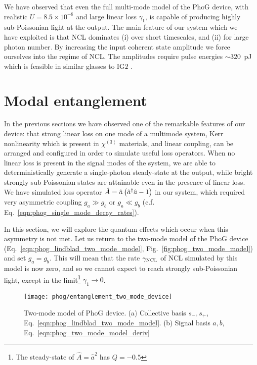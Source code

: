 We have observed that even the full multi-mode model of the PhoG device, with realistic $U=8.5\times10^{-8}$ and large linear loss $\gamma_1$, is capable of producing highly sub-Poissonian light at the output. The main feature of our system which we have exploited is that NCL dominates (i) over short timescales, and (ii) for large photon number. By increasing the input coherent state amplitude we force ourselves into the regime of NCL. The amplitudes require pulse energies $\sim 320$~pJ which is feasible in similar glasses to IG$2$ \cite{Butcher2018}.

\section{Modal entanglement}\label{sec:phog_entanglement}
In the previous sections we have observed one of the remarkable features of our device: that strong linear loss on one mode of a multimode system, Kerr nonlinearity which is present in $\chi^{\left(3\right)}$ materials, and linear coupling, can be arranged and configured in order to simulate useful loss operators. When no linear loss is present in the signal modes of the system, we are able to deterministically generate a single-photon steady-state at the output, while bright strongly sub-Poissonian states are attainable even in the presence of linear loss. We have simulated loss operator $\hat{A} = \hat{a}\left(\hat{a}^\dagger \hat{a} - 1\right)$ in our system, which required very asymmetric coupling $g_a \gg g_b$ or $g_a \ll g_b$ (c.f. Eq.~\ref{eqn:phog_single_mode_decay_rates}). 

In this section, we will explore the quantum effects which occur when this asymmetry is not met. Let us return to the two-mode model of the PhoG device (Eq.~\ref{eqn:phog_lindblad_two_mode_model}, Fig.~\ref{fig:phog_two_mode_model}) and set $g_a = g_b$. This will mean that the rate $\gamma_{\text{NCL}}$ of NCL simulated by this model is now zero, and so we cannot expect to reach strongly sub-Poissonian light, except in the limit\footnote{The steady-state of $\hat{A} = \hat{a}^2$ has $Q = -0.5$} $\gamma_1 \rightarrow 0$.

\begin{figure}[htp]
\captionsetup{width=0.8\linewidth}
\centering
\texttt{[image: phog/entanglement\_two\_mode\_device]}
\caption{\label{fig:phog_entanglement_two_mode_device} Two-mode model of PhoG device. (a) Collective basis $s_-, s_+$, Eq.~\ref{eqn:phog_lindblad_two_mode_model}. (b) Signal basis $a, b$, Eq.~\ref{eqn:phog_two_mode_model_deriv}}
\end{figure}

